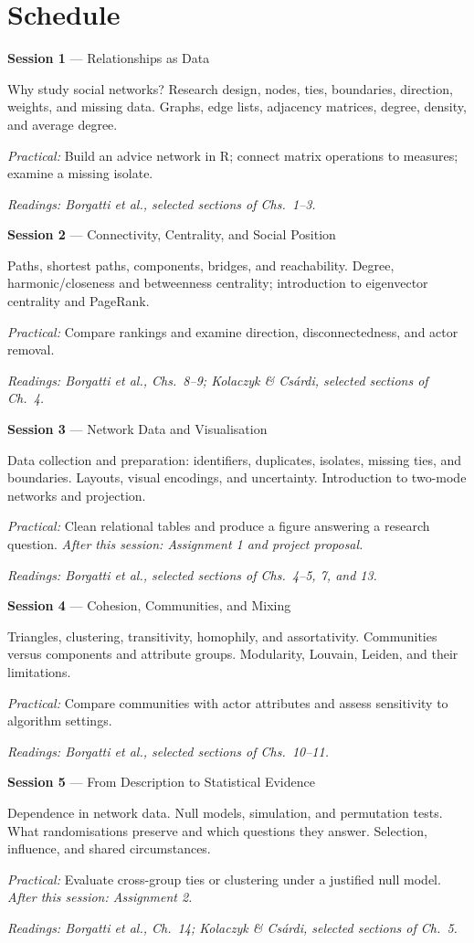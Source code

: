 \documentclass[a4paper,11pt]{article}
\newcommand{\session}[4]{\needspace{7\baselineskip}\textbf{Session #1} --- #2\par
\hspace*{1em}\begin{minipage}{\dimexpr\linewidth-1em\relax}#3\par
\textit{Readings: #4}\end{minipage}\par\smallskip}
\begin{document}
\section*{Schedule}

\session{1}{Relationships as Data}{
Why study social networks? Research design, nodes, ties, boundaries, direction, weights, and missing data. Graphs, edge lists, adjacency matrices, degree, density, and average degree.\par
\textit{Practical:} Build an advice network in R; connect matrix operations to measures; examine a missing isolate.
}{Borgatti et al., selected sections of Chs.~1--3.}

\session{2}{Connectivity, Centrality, and Social Position}{
Paths, shortest paths, components, bridges, and reachability. Degree, harmonic/closeness and betweenness centrality; introduction to eigenvector centrality and PageRank.\par
\textit{Practical:} Compare rankings and examine direction, disconnectedness, and actor removal.
}{Borgatti et al., Chs.~8--9; Kolaczyk \& Cs\'{a}rdi, selected sections of Ch.~4.}

\session{3}{Network Data and Visualisation}{
Data collection and preparation: identifiers, duplicates, isolates, missing ties, and boundaries. Layouts, visual encodings, and uncertainty. Introduction to two-mode networks and projection.\par
\textit{Practical:} Clean relational tables and produce a figure answering a research question. \textit{After this session: Assignment 1 and project proposal.}
}{Borgatti et al., selected sections of Chs.~4--5, 7, and 13.}

\session{4}{Cohesion, Communities, and Mixing}{
Triangles, clustering, transitivity, homophily, and assortativity. Communities versus components and attribute groups. Modularity, Louvain, Leiden, and their limitations.\par
\textit{Practical:} Compare communities with actor attributes and assess sensitivity to algorithm settings.
}{Borgatti et al., selected sections of Chs.~10--11.}

\session{5}{From Description to Statistical Evidence}{
Dependence in network data. Null models, simulation, and permutation tests. What randomisations preserve and which questions they answer. Selection, influence, and shared circumstances.\par
\textit{Practical:} Evaluate cross-group ties or clustering under a justified null model. \textit{After this session: Assignment 2.}
}{Borgatti et al., Ch.~14; Kolaczyk \& Cs\'{a}rdi, selected sections of Ch.~5.}
\end{document}
